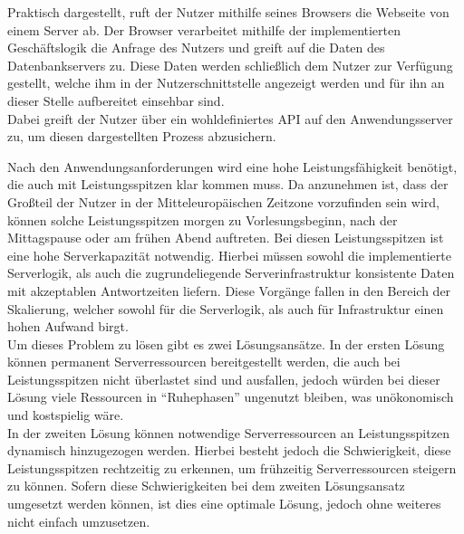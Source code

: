 Praktisch dargestellt, ruft der Nutzer mithilfe seines Browsers die Webseite von einem Server ab.
Der Browser verarbeitet mithilfe der implementierten Geschäftslogik die Anfrage des Nutzers und greift auf die Daten des Datenbankservers zu. Diese Daten werden schließlich dem Nutzer zur Verfügung gestellt, welche ihm in der Nutzerschnittstelle angezeigt werden und für ihn an  dieser Stelle aufbereitet einsehbar sind.\\
Dabei greift der Nutzer über ein wohldefiniertes \ac{API} auf den Anwendungsserver zu, um diesen dargestellten Prozess abzusichern.


Nach den Anwendungsanforderungen wird eine hohe Leistungsfähigkeit benötigt, die auch mit Leistungsspitzen klar kommen muss. Da anzunehmen ist, dass der Großteil der Nutzer in der Mitteleuropäischen Zeitzone vorzufinden sein wird, können solche Leistungsspitzen morgen zu Vorlesungsbeginn, nach der Mittagspause oder am frühen Abend auftreten. Bei diesen Leistungsspitzen ist eine hohe Serverkapazität notwendig.
Hierbei müssen sowohl die implementierte Serverlogik, als auch die zugrundeliegende Serverinfrastruktur konsistente Daten mit akzeptablen Antwortzeiten liefern. Diese Vorgänge fallen in den Bereich der Skalierung, welcher sowohl für die Serverlogik, als auch für Infrastruktur einen hohen Aufwand birgt.\\
Um dieses Problem zu lösen gibt es zwei Lösungsansätze. In der ersten Lösung können permanent Serverressourcen bereitgestellt werden, die auch bei Leistungsspitzen nicht überlastet sind und ausfallen, jedoch würden bei dieser Lösung viele Ressourcen in \enquote{Ruhephasen} ungenutzt bleiben, was unökonomisch und kostspielig wäre.\\
In der zweiten Lösung können notwendige Serverressourcen an Leistungsspitzen dynamisch hinzugezogen werden. Hierbei besteht jedoch die Schwierigkeit, diese Leistungsspitzen rechtzeitig zu erkennen, um frühzeitig Serverressourcen steigern zu können. Sofern diese Schwierigkeiten bei dem zweiten Lösungsansatz umgesetzt werden können, ist dies eine optimale Lösung, jedoch ohne weiteres nicht einfach umzusetzen.\\






